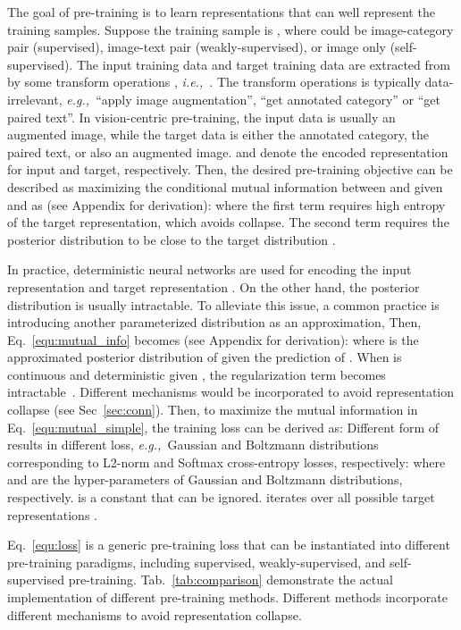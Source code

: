 \documentclass[10pt,twocolumn,letterpaper]{article}
\def\eg{\textit{e.g.,~}}
\def\ie{\textit{i.e.,~}}
\newcommand\smallalign[1]{\begingroup\small
    \setlength{\abovedisplayskip}{0.7em}
    \setlength{\belowdisplayskip}{0.7em}
    \setlength{\abovedisplayshortskip}{0.7em}
    \setlength{\belowdisplayshortskip}{0.7em}
    {#1}\endgroup}
\begin{document}
The goal of pre-training is to learn representations that can well represent the training samples.
Suppose the training sample is , where  could be image-category pair (supervised), image-text pair (weakly-supervised), or image only (self-supervised). The input training data  and target training data  are extracted from  by some transform operations , \ie . The transform operations  is typically data-irrelevant, \eg ``apply image augmentation'', ``get annotated category'' or ``get paired text''. In vision-centric pre-training, the input data  is usually an augmented image, while the target data  is either the annotated category, the paired text, or also an augmented image.  and  denote the encoded representation for input and target, respectively. Then, the desired pre-training objective can be described as maximizing the conditional mutual information between  and  given  and  as (see Appendix for derivation):
\smallalign{}\vspace{-1em}
\smallalign{}where the first term requires high entropy of the target representation, which avoids collapse. The second term requires the posterior distribution  to be close to the target distribution . 

In practice, deterministic neural networks are used for encoding the input representation  and target representation . On the other hand, the posterior distribution  is usually intractable. To alleviate this issue, a common practice is introducing another parameterized distribution  as an approximation, Then, Eq.~\eqref{equ:mutual_info} becomes (see Appendix for derivation):
\smallalign{}\vspace{-2em}
\smallalign{}where  is the approximated posterior distribution of  given the prediction of . When  is continuous and deterministic given , the regularization term becomes intractable~\cite{belghazi2018mine,tishby2000information}. Different mechanisms would be incorporated to avoid representation collapse (see Sec~\ref{sec:conn}). Then, to maximize the mutual information in Eq.~\eqref{equ:mutual_simple}, the training loss can be derived as:
\smallalign{}Different form of  results in different loss, \eg Gaussian and Boltzmann distributions corresponding to L2-norm and Softmax cross-entropy losses, respectively:
\smallalign{}where  and  are the hyper-parameters of Gaussian and Boltzmann distributions, respectively.  is a constant that can be ignored.  iterates over all possible target representations .

Eq.~\eqref{equ:loss} is a generic pre-training loss that can be instantiated into different pre-training paradigms, including supervised, weakly-supervised, and self-supervised pre-training. 
Tab.~\ref{tab:comparison} demonstrate the actual implementation of different pre-training methods. Different methods incorporate different mechanisms to avoid representation collapse. 
\end{document}

